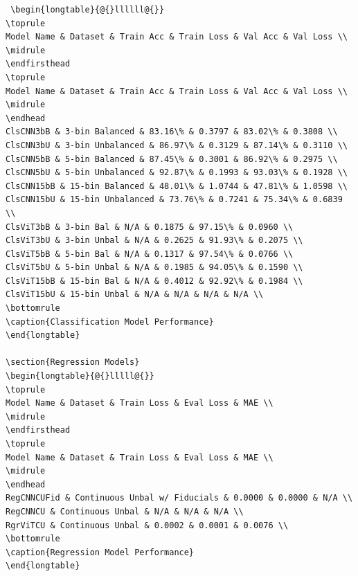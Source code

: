 \begin{verbatim}
 \begin{longtable}{@{}llllll@{}}
\toprule
Model Name & Dataset & Train Acc & Train Loss & Val Acc & Val Loss \\
\midrule
\endfirsthead
\toprule
Model Name & Dataset & Train Acc & Train Loss & Val Acc & Val Loss \\
\midrule
\endhead
ClsCNN3bB & 3-bin Balanced & 83.16\% & 0.3797 & 83.02\% & 0.3808 \\
ClsCNN3bU & 3-bin Unbalanced & 86.97\% & 0.3129 & 87.14\% & 0.3110 \\
ClsCNN5bB & 5-bin Balanced & 87.45\% & 0.3001 & 86.92\% & 0.2975 \\
ClsCNN5bU & 5-bin Unbalanced & 92.87\% & 0.1993 & 93.03\% & 0.1928 \\
ClsCNN15bB & 15-bin Balanced & 48.01\% & 1.0744 & 47.81\% & 1.0598 \\
ClsCNN15bU & 15-bin Unbalanced & 73.76\% & 0.7241 & 75.34\% & 0.6839 \\
ClsViT3bB & 3-bin Bal & N/A & 0.1875 & 97.15\% & 0.0960 \\
ClsViT3bU & 3-bin Unbal & N/A & 0.2625 & 91.93\% & 0.2075 \\
ClsViT5bB & 5-bin Bal & N/A & 0.1317 & 97.54\% & 0.0766 \\
ClsViT5bU & 5-bin Unbal & N/A & 0.1985 & 94.05\% & 0.1590 \\
ClsViT15bB & 15-bin Bal & N/A & 0.4012 & 92.92\% & 0.1984 \\
ClsViT15bU & 15-bin Unbal & N/A & N/A & N/A & N/A \\
\bottomrule
\caption{Classification Model Performance}
\end{longtable}

\section{Regression Models}
\begin{longtable}{@{}lllll@{}}
\toprule
Model Name & Dataset & Train Loss & Eval Loss & MAE \\
\midrule
\endfirsthead
\toprule
Model Name & Dataset & Train Loss & Eval Loss & MAE \\
\midrule
\endhead
RegCNNCUFid & Continuous Unbal w/ Fiducials & 0.0000 & 0.0000 & N/A \\
RegCNNCU & Continuous Unbal & N/A & N/A & N/A \\
RgrViTCU & Continuous Unbal & 0.0002 & 0.0001 & 0.0076 \\
\bottomrule
\caption{Regression Model Performance}
\end{longtable}


\end{verbatim}

